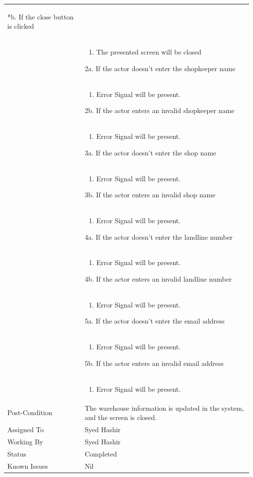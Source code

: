 \documentclass[12pt,a4paper]{article}
\begin{document}
\begin{longtable}{| p{3cm}|p{12cm}|}
\begin{enumerate}
	\end{enumerate}
*b. If the close button is clicked\\
&	\begin{enumerate}
		\item The presented screen will be closed
	\end{enumerate}
2a. If the actor doesn't enter the shopkeeper name \\ 	
&	\begin{enumerate}
		\item Error Signal will be present.
	\end{enumerate}
2b. If the actor enters an invalid shopkeeper name \\ 	
&	\begin{enumerate}
		\item Error Signal will be present.
	\end{enumerate}
3a. If the actor doesn't enter the shop name \\ 	
&	\begin{enumerate}
		\item Error Signal will be present.
	\end{enumerate}
3b. If the actor enters an invalid shop name \\ 	
&	\begin{enumerate}
		\item Error Signal will be present.
	\end{enumerate}
4a. If the actor doesn't enter the landline number \\ 	
&	\begin{enumerate}
		\item Error Signal will be present.
	\end{enumerate}
4b. If the actor enters an invalid landline number\\ 	
&	\begin{enumerate}
		\item Error Signal will be present.
	\end{enumerate}
5a. If the actor doesn't enter the email address \\ 	
&	\begin{enumerate}
		\item Error Signal will be present.
	\end{enumerate}
5b. If the actor enters an invalid email address\\ 	
&	\begin{enumerate}
		\item Error Signal will be present.
	\end{enumerate}
\\ \hline
Post-Condition & The warehouse information is updated in the system, and the screen is closed.  \\\hline
Assigned To &  Syed Hashir
\\ \hline
Working By &   Syed Hashir
\\ \hline
Status & 	Completed	
\\ \hline
Known Issues & Nil
\\\hline
\end{longtable}
\end{document}
